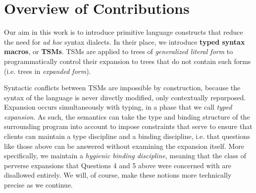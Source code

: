 





\section{Overview of Contributions}\label{sec:contributions}
Our aim in this work is to introduce primitive language constructs that reduce the need for \emph{ad hoc} syntax dialects. In their place, we 
introduce \textbf{typed syntax macros}, or \textbf{TSMs}. TSMs are applied to trees of \emph{generalized literal form} to programmatically control their expansion to trees that do not contain such forms (i.e. trees in \emph{expanded form}).

Syntactic conflicts between TSMs are impossible by construction, because the syntax of the language is never directly modified, only contextually repurposed. Expansion occurs simultaneously with typing, in a phase that we call \emph{typed expansion}. As such, the semantics can take the type and binding structure of the surrounding program into account to impose constraints that serve to ensure that clients can maintain a type discipline and a binding discipline, i.e. that questions like those above can be answered without examining the expansion itself. More specifically, we maintain a \emph{hygienic binding discipline}, meaning that the class of perverse expansions that Questions 4 and 5 above were concerned with are disallowed entirely. We will, of course, make these notions more technically precise as we continue.

